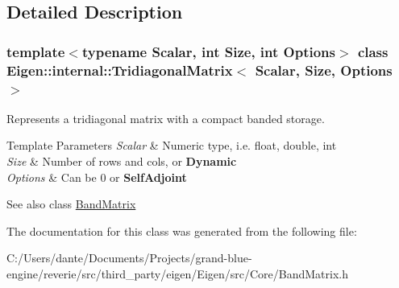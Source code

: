 \subsection{Detailed Description}
\subsubsection*{template$<$typename Scalar, int Size, int Options$>$\newline
class Eigen\+::internal\+::\+Tridiagonal\+Matrix$<$ Scalar, Size, Options $>$}

Represents a tridiagonal matrix with a compact banded storage. 


\begin{DoxyTemplParams}{Template Parameters}
{\em Scalar} & Numeric type, i.\+e. float, double, int \\
\hline
{\em Size} & Number of rows and cols, or {\bfseries{Dynamic}} \\
\hline
{\em Options} & Can be 0 or {\bfseries{Self\+Adjoint}} \\
\hline
\end{DoxyTemplParams}
\begin{DoxySeeAlso}{See also}
class \mbox{\hyperlink{class_eigen_1_1internal_1_1_band_matrix}{Band\+Matrix}} 
\end{DoxySeeAlso}


The documentation for this class was generated from the following file\+:\begin{DoxyCompactItemize}
\item 
C\+:/\+Users/dante/\+Documents/\+Projects/grand-\/blue-\/engine/reverie/src/third\+\_\+party/eigen/\+Eigen/src/\+Core/Band\+Matrix.\+h\end{DoxyCompactItemize}
